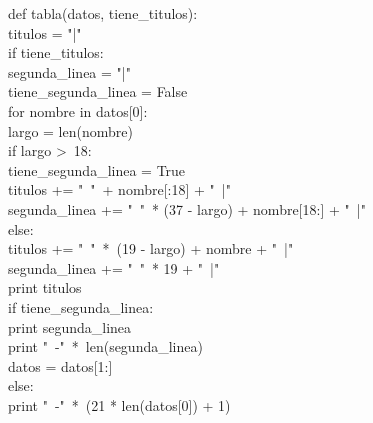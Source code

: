 \documentclass[10pt,letterpaper]{article}
\newenvironment{Code}
{
\begin{lrbox}{\selvestebox}%
\begin{minipage}{\dimexpr\columnwidth-2\fboxsep\relax}
\fontfamily{\ttdefault}\selectfont
}
{\end{minipage}\end{lrbox}%
\begin{center}
\colorbox{light-gray}{\usebox{\selvestebox}}
\end{center}
}
\begin{document}
\begin{small}
\begin{Code}
def tabla(datos, tiene\_titulos):\\
\hspace*{4mm} titulos = "|"\\
\hspace*{4mm} if tiene\_titulos:\\
\hspace*{11mm} segunda\_linea = "|"\\
\hspace*{11mm} tiene\_segunda\_linea = False\\
\hspace*{11mm} for nombre in datos[0]:\\
\hspace*{18mm} largo = len(nombre)\\
\hspace*{18mm} if largo >\ 18:\\
\hspace*{25mm} tiene\_segunda\_linea = True\\
\hspace*{25mm} titulos += "\ "\ + nombre[:18] + "\ |"\\
\hspace*{25mm} segunda\_linea += "\ "\ * (37 - largo) + nombre[18:] + "\ |"\\
\hspace*{18mm} else:\\
\hspace*{25mm} titulos += "\ "\ *\ (19 - largo) + nombre + "\ |"\\
\hspace*{25mm} segunda\_linea += "\ "\ * 19 + "\ |"\\
\hspace*{11mm} print titulos\\
\hspace*{11mm} if tiene\_segunda\_linea:\\
\hspace*{18mm} print segunda\_linea\\
\hspace*{11mm} print "\ \hspace*{-2mm}-"\ *\ len(segunda\_linea)\\
\hspace*{11mm} datos = datos[1:]\\
\hspace*{4mm} else:\\
\hspace*{11mm} print "\ \hspace*{-2mm}-"\ *\ (21 * len(datos[0]) + 1)\\

\end{Code}
\end{small}
\end{document}
